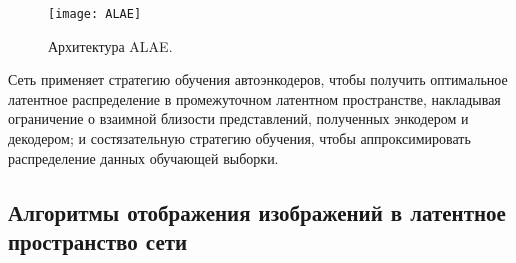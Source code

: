 \begin{enumerate}
\begin{figure}[h]
\begin{center}
    \texttt{[image: ALAE]}
    \caption{Архитектура ALAE.}
    \label{fig:alae}
\end{center}
\end{figure}

Сеть применяет стратегию обучения автоэнкодеров, чтобы получить оптимальное латентное распределение в промежуточном латентном пространстве, накладывая ограничение о взаимной близости представлений, полученных энкодером и декодером;
и состязательную стратегию обучения, чтобы аппроксимировать распределение данных обучающей выборки.

\end{enumerate}

\subsection{Алгоритмы отображения изображений в латентное пространство сети}

